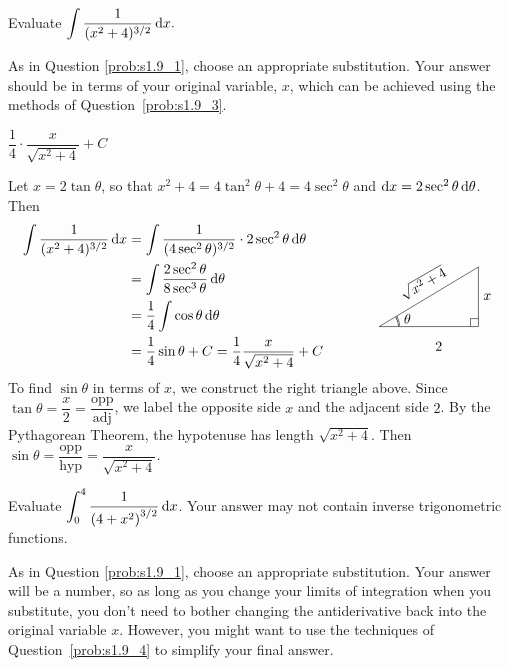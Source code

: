 \subsection*{\Procedural}

\begin{question}[2016Q4]\label{prob:s1.9_P1}
Evaluate $\displaystyle\int \frac1{(x^2+4)^{3/2}} \,\mathrm{d}x.$
\end{question}

\begin{hint}
As in Question \ref{prob:s1.9_1}, choose an appropriate substitution. Your answer should be in terms of your original variable, $x$, which can be achieved using the methods of Question~\ref{prob:s1.9_3}.
\end{hint}

\begin{answer}
$\dfrac14\cdot \dfrac x{\sqrt{x^2+4}} + C$
\end{answer}

\begin{solution}
Let $x = 2\tan\theta$, so that $x^2+4 = 4\tan^2\theta+4=4\sec^2\theta$ and $\mathrm{d}x = 2\sec^2\theta\,\mathrm{d}\theta$. Then
\begin{align*}
\int \frac1{(x^2+4)^{3/2}} \,\dee{x} &= \int \frac1{(4\sec^2\theta)^{3/2}} \cdot 2\sec^2\theta\,\dee{\theta} \\
&= \int \frac{2\sec^2\theta}{8\sec^3\theta} \,\dee{\theta} \\
&=\frac14 \int \cos\theta\,\dee{\theta} \\
&= \frac14\sin\theta+C = \frac14 \frac x{\sqrt{x^2+4}} + C
\qquad\qquad\smash{
\trigtri{\theta}{2}{x}{\sqrt{x^2+4}}}
\end{align*}
To find $\sin\theta$ in terms of $x$, we construct the right triangle above.
Since $\tan\theta = \dfrac{x}{2} = \dfrac{\mbox{opp}}{\mbox{adj}}$, we label the opposite side $x$ and the adjacent side $2$. By the Pythagorean Theorem, the hypotenuse has length $\sqrt{x^2+4}$. Then $\sin\theta = \dfrac{\mbox{opp}}{\mbox{hyp}} = \dfrac{x}{\sqrt{x^2+4}}$.
\end{solution}

\begin{question}[2016Q4]
Evaluate
$\displaystyle\int_0^4 \frac{1}{{(4+x^2)}^{3/2}}\,\mathrm{d}x$.
Your answer may not contain inverse trigonometric functions.
\end{question}
\begin{hint}
As in Question \ref{prob:s1.9_1}, choose an appropriate substitution. Your answer will be a number, so as long as you change your limits of integration when you substitute, you don't need to bother changing the antiderivative back into the original variable $x$. However, you might want to use the techniques of Question~\ref{prob:s1.9_4} to simplify your final answer.
\end{hint}

